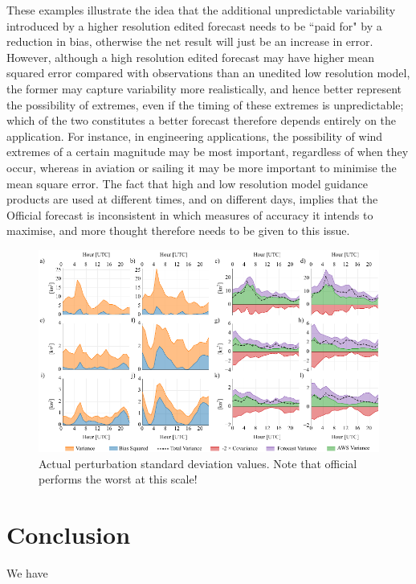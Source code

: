 \documentclass{ametsoc}
\begin{document}
These examples illustrate the idea that the additional unpredictable variability introduced by a higher resolution edited forecast needs to be ``paid for" by a reduction in bias, otherwise the net result will just be an increase in error. However, although a high resolution edited forecast may have higher mean squared error compared with observations than an unedited low resolution model, the former may capture variability more realistically, and hence better represent the possibility of extremes, even if the timing of these extremes is unpredictable; which of the two constitutes a better forecast therefore depends entirely on the application. For instance, in engineering applications, the possibility of wind extremes of a certain magnitude may be most important, regardless of when they occur, whereas in aviation or sailing it may be more important to minimise the mean square error. The fact that high and low resolution model guidance products are used at different times, and on different days, implies that the Official forecast is inconsistent in which measures of accuracy it intends to maximise, and more thought therefore needs to be given to this issue.  

\begin{figure}
\centering
\includegraphics[width=39pc]{error_decomp_v.pdf}
\caption{Actual perturbation standard deviation values. Note that official performs the worst at this scale!}
\label{Fig:error_decomp_v}
\end{figure}

\section{Conclusion}
\label{Sec:Conclusion}
We have



\end{document}
